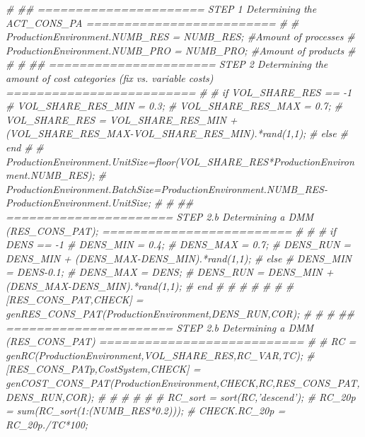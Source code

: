 \documentclass[]{article}
\newenvironment{Shaded}{\begin{snugshade}}{\end{snugshade}}
\newcommand{\CommentTok}[1]{\textcolor[rgb]{0.56,0.35,0.01}{\textit{#1}}}
\begin{document}
\begin{Shaded}
\begin{Highlighting}[]
 \CommentTok{# ## ====================== STEP 1  Determining the ACT_CONS_PA  =========================}
 \CommentTok{#    }
 \CommentTok{#  ProductionEnvironment.NUMB_RES = NUMB_RES; #Amount of processes}
 \CommentTok{#  ProductionEnvironment.NUMB_PRO = NUMB_PRO; #Amount of products}
 \CommentTok{#  }
 \CommentTok{#  }
 \CommentTok{# ## ====================== STEP 2 Determining the amount of cost categories (fix vs. variable costs) =========================}
 \CommentTok{#    }
 \CommentTok{#  if VOL_SHARE_RES == -1}
 \CommentTok{#  VOL_SHARE_RES_MIN = 0.3; }
 \CommentTok{#  VOL_SHARE_RES_MAX = 0.7;}
 \CommentTok{#  VOL_SHARE_RES = VOL_SHARE_RES_MIN + (VOL_SHARE_RES_MAX-VOL_SHARE_RES_MIN).*rand(1,1);}
 \CommentTok{#  else}
 \CommentTok{#  end }
 \CommentTok{#  }
 \CommentTok{#  ProductionEnvironment.UnitSize=floor(VOL_SHARE_RES*ProductionEnvironment.NUMB_RES);}
 \CommentTok{#  ProductionEnvironment.BatchSize=ProductionEnvironment.NUMB_RES-ProductionEnvironment.UnitSize;}
 \CommentTok{#  }
 \CommentTok{# ## ====================== STEP 2.b Determining a DMM (RES_CONS_PAT);  =========================}
 \CommentTok{#    }
 \CommentTok{#    %% Randomization and setting clear design points. }
 \CommentTok{#  if DENS == -1}
 \CommentTok{#  DENS_MIN = 0.4; }
 \CommentTok{#  DENS_MAX = 0.7;}
 \CommentTok{#  DENS_RUN = DENS_MIN + (DENS_MAX-DENS_MIN).*rand(1,1);}
 \CommentTok{#  else}
 \CommentTok{#    DENS_MIN = DENS-0.1;}
 \CommentTok{#  DENS_MAX = DENS;}
 \CommentTok{#  DENS_RUN = DENS_MIN + (DENS_MAX-DENS_MIN).*rand(1,1);}
 \CommentTok{#  end }
 \CommentTok{#  }
 \CommentTok{#  }
 \CommentTok{#  }
 \CommentTok{#  %DENS_RUN = 1 ; }
 \CommentTok{#  }
 \CommentTok{#  }
 \CommentTok{#  [RES_CONS_PAT,CHECK] = genRES_CONS_PAT(ProductionEnvironment,DENS_RUN,COR); % generate res_cons_pat}
 \CommentTok{#  %[RES_CONS_PAT,CHECK] = genRES_CONS_PAT2(ProductionEnvironment,DENS_RUN,COR); % generate res_cons_pat}
 \CommentTok{#  }
 \CommentTok{#  ## ====================== STEP 2.b Determining a DMM (RES_CONS_PAT) ===========================}
 \CommentTok{#    }
 \CommentTok{#    RC = genRC(ProductionEnvironment,VOL_SHARE_RES,RC_VAR,TC);}
 \CommentTok{#  [RES_CONS_PATp,CostSystem,CHECK] = genCOST_CONS_PAT(ProductionEnvironment,CHECK,RC,RES_CONS_PAT,DENS_RUN,COR);}
 \CommentTok{#  }
 \CommentTok{#  }
 \CommentTok{#  }
 \CommentTok{#  %% COMPUTING DESCRIPTIVE VALUES }
 \CommentTok{#  % Computing Resource cost percentage: How many percentage are in the}
 \CommentTok{#  RC_sort = sort(RC,'descend');}
 \CommentTok{#  RC_20p = sum(RC_sort(1:(NUMB_RES*0.2)));}
 \CommentTok{#  CHECK.RC_20p = RC_20p./TC*100;}
}}}}}}
\end{Highlighting}
\end{Shaded}
\end{document}
